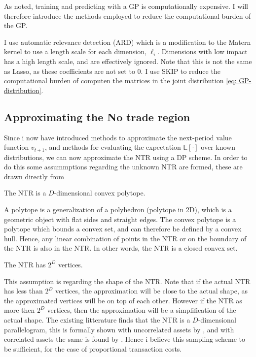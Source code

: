 \documentclass[11pt]{article}
\begin{document}
As noted, training and predicting with a \ac{GP} is computationally expensive. I will therefore introduce
the methods employed to reduce the computational burden of the \ac{GP}.

I use automatic relevance detection (ARD) which is a modification to the Matern kernel to use
a length scale for each dimension, $\ell_{i}$. Dimensions with low impact has a high length scale, and are effectively ignored.
Note that this is not the same as Lasso, as these coefficients are not set to $0$.
I use \ac{SKIP} to reduce the computational burden of computen the matrices in the joint distribution \eqref{eq: GP-distribution}.


\subsection{Approximating the No trade region} \label{Subsection: Approximating_NTR}
Since i now have introduced methods to approximate the next-period value function $v_{t+1}$, and methods for evaluating the expectation $\mathbb{E}[\cdot]$
over known distributions, we can now approximate the \ac{NTR} using a \ac{DP} scheme. In order to do this some assummptions regarding the unknown NTR are formed,
these are drawn directly from \autocite{Scheidegger2023}
\begin{assumption}\label{assumption: NTR-convex}
  The NTR is a $D$-dimensional convex polytope.
\end{assumption}
A polytope is a generalization of a polyhedron (polytope in 2D), which is a geometric object with flat sides and straight edges.
  The convex polytope is a polytope which bounds a convex set, and can therefore be defined by a convex hull. Hence, any linear combination of points in the \ac{NTR} or on the boundary of the \ac{NTR} is also in the \ac{NTR}.
  In other words, the \ac{NTR} is a closed convex set.
\begin{assumption}\label{assumption: NTR-vertices}
  The NTR has $2^{D}$ vertices.
\end{assumption}
This assumption is regarding the shape of the \ac{NTR}. Note that if the actual \ac{NTR} has less than $2^{D}$ vertices, the approximation will be close to the actual shape, as the approximated vertices will be on top of each other.
However if the \ac{NTR} as more then $2^{D}$ vertices, then the approximation will be a simplification of the actual shape. 
The existing litterature finds that the \ac{NTR} is a $D$-dimensional parallelogram, this is formally shown with uncorrelated assets by \autocite{liu2002}, and with correlated assets the same is found by \autocite{CaiJuddXu2013,Dybvig2020}.
Hence i believe this sampling scheme to be sufficient, for the case of proportional transaction costs.
\end{document}
